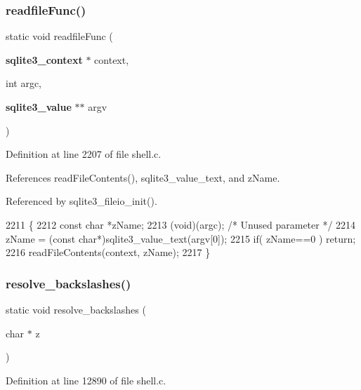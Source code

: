 \subsubsection{readfile\+Func()}
{\footnotesize\ttfamily static void readfile\+Func (\begin{DoxyParamCaption}\item[{\textbf{ sqlite3\+\_\+context} $\ast$}]{context,  }\item[{int}]{argc,  }\item[{\textbf{ sqlite3\+\_\+value} $\ast$$\ast$}]{argv }\end{DoxyParamCaption})\hspace{0.3cm}{\ttfamily [static]}}



Definition at line 2207 of file shell.\+c.



References read\+File\+Contents(), sqlite3\+\_\+value\+\_\+text, and z\+Name.



Referenced by sqlite3\+\_\+fileio\+\_\+init().


\begin{DoxyCode}
2211  \{
2212   \textcolor{keyword}{const} \textcolor{keywordtype}{char} *zName;
2213   (void)(argc);  \textcolor{comment}{/* Unused parameter */}
2214   zName = (\textcolor{keyword}{const} \textcolor{keywordtype}{char}*)sqlite3_value_text(argv[0]);
2215   \textcolor{keywordflow}{if}( zName==0 ) \textcolor{keywordflow}{return};
2216   readFileContents(context, zName);
2217 \}
\end{DoxyCode}
\mbox{\label{shell_8c_a42f12cc7304b47cf727c489099c47b64}} 
\subsubsection{resolve\+\_\+backslashes()}
{\footnotesize\ttfamily static void resolve\+\_\+backslashes (\begin{DoxyParamCaption}\item[{char $\ast$}]{z }\end{DoxyParamCaption})\hspace{0.3cm}{\ttfamily [static]}}



Definition at line 12890 of file shell.\+c.



